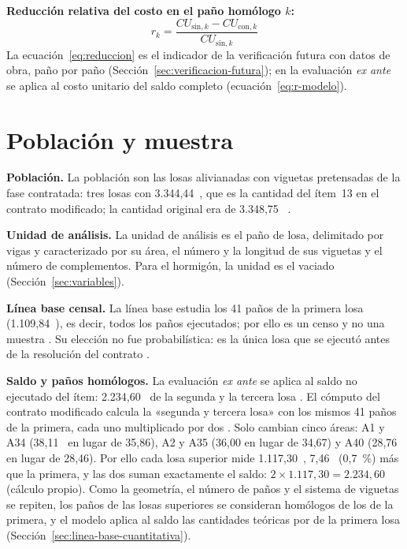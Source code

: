 \textbf{Reducción relativa del costo en el paño homólogo $k$:}
\begin{equation}
  r_k = \frac{CU_{\text{sin},k} - CU_{\text{con},k}}{CU_{\text{sin},k}}
  \label{eq:reduccion}
\end{equation}
La ecuación~\eqref{eq:reduccion} es el indicador de la verificación futura con datos de obra, paño por paño (Sección~\ref{sec:verificacion-futura}); en la evaluación \emph{ex ante} se aplica al costo unitario del saldo completo (ecuación~\ref{eq:r-modelo}).

\section{Población y muestra}
\label{sec:poblacion}

\textbf{Población.} La población son las losas alivianadas con viguetas pretensadas de la fase contratada: tres losas con 3.344,44~\mdos{}, que es la cantidad del ítem~13 en el contrato modificado; la cantidad original era de 3.348,75~\mdos{} \parencite[p.~16]{uatf2025pao2}.

\textbf{Unidad de análisis.} La unidad de análisis es el paño de losa, delimitado por vigas y caracterizado por su área, el número y la longitud de sus viguetas y el número de complementos. Para el hormigón, la unidad es el vaciado (Sección~\ref{sec:variables}).

\textbf{Línea base censal.} La línea base estudia los 41 paños de la primera losa (1.109,84~\mdos{}), es decir, todos los paños ejecutados; por ello es un censo y no una muestra \parencite[p.~196]{hernandez2018}. Su elección no fue probabilística: es la única losa que se ejecutó antes de la resolución del contrato \parencite[p.~200]{hernandez2018}.

\textbf{Saldo y paños homólogos.} La evaluación \emph{ex ante} se aplica al saldo no ejecutado del ítem: 2.234,60~\mdos{} de la segunda y la tercera losa \parencite[p.~16]{uatf2025pao2}. El cómputo del contrato modificado calcula la «segunda y tercera losa» con los mismos 41 paños de la primera, cada uno multiplicado por dos \parencite[pp.~18--19]{uatf_item13}. Solo cambian cinco áreas: A1 y A34 (38,11~\mdos{} en lugar de 35,86), A2 y A35 (36,00 en lugar de 34,67) y A40 (28,76 en lugar de 28,46). Por ello cada losa superior mide 1.117,30~\mdos{}, 7,46~\mdos{} (0,7~\%) más que la primera, y las dos suman exactamente el saldo: $2 \times 1.117{,}30 = 2.234{,}60$~\mdos{} (cálculo propio). Como la geometría, el número de paños y el sistema de viguetas se repiten, los paños de las losas superiores se consideran homólogos de los de la primera, y el modelo aplica al saldo las cantidades teóricas por \mdos{} de la primera losa (Sección~\ref{sec:linea-base-cuantitativa}).

